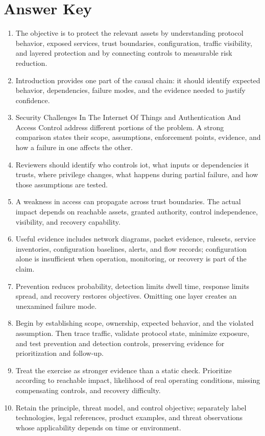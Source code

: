 \documentclass[11pt,letterpaper]{article}
\begin{document}
\section*{Answer Key}
\begin{enumerate}
\item The objective is to protect the relevant assets by understanding protocol behavior, exposed services, trust boundaries, configuration, traffic visibility, and layered protection and by connecting controls to measurable risk reduction.
\item Introduction provides one part of the causal chain: it should identify expected behavior, dependencies, failure modes, and the evidence needed to justify confidence.
\item Security Challenges In The Internet Of Things and Authentication And Access Control address different portions of the problem. A strong comparison states their scope, assumptions, enforcement points, evidence, and how a failure in one affects the other.
\item Reviewers should identify who controls iot, what inputs or dependencies it trusts, where privilege changes, what happens during partial failure, and how those assumptions are tested.
\item A weakness in access can propagate across trust boundaries. The actual impact depends on reachable assets, granted authority, control independence, visibility, and recovery capability.
\item Useful evidence includes network diagrams, packet evidence, rulesets, service inventories, configuration baselines, alerts, and flow records; configuration alone is insufficient when operation, monitoring, or recovery is part of the claim.
\item Prevention reduces probability, detection limits dwell time, response limits spread, and recovery restores objectives. Omitting one layer creates an unexamined failure mode.
\item Begin by establishing scope, ownership, expected behavior, and the violated assumption. Then trace traffic, validate protocol state, minimize exposure, and test prevention and detection controls, preserving evidence for prioritization and follow-up.
\item Treat the exercise as stronger evidence than a static check. Prioritize according to reachable impact, likelihood of real operating conditions, missing compensating controls, and recovery difficulty.
\item Retain the principle, threat model, and control objective; separately label technologies, legal references, product examples, and threat observations whose applicability depends on time or environment.
\end{enumerate}
\end{document}
